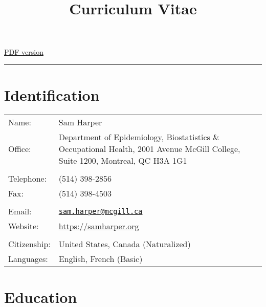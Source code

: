 \documentclass[
  letterpaper,
  DIV=11,
  numbers=noendperiod]{scrartcl}
\title{Curriculum Vitae}
\author{}
\date{}
\begin{document}
\maketitle
\ifdefined\Shaded\renewenvironment{Shaded}{\begin{tcolorbox}[boxrule=0pt, breakable, interior hidden, sharp corners, frame hidden, borderline west={3pt}{0pt}{shadecolor}, enhanced]}{\end{tcolorbox}}\fi

\href{/cv/index.pdf}{PDF version}

\begin{center}\rule{0.5\linewidth}{0.5pt}\end{center}

\hypertarget{identification}{%
\section{Identification}\label{identification}}

\begin{longtable}[]{@{}
  >{\raggedright\arraybackslash}p{}
  >{\raggedright\arraybackslash}p{}@{}}
\toprule\noalign{}
\endhead
\bottomrule\noalign{}
\endlastfoot
Name: & Sam Harper \\
Office: & Department of Epidemiology, Biostatistics \& Occupational
Health, 2001 Avenue McGill College, Suite 1200, Montreal, QC H3A 1G1 \\
& \\
Telephone: & (514) 398-2856 \\
Fax: & (514) 398-4503 \\
& \\
Email: &
\href{mailto:sam.harper@mcgill.ca}{\nolinkurl{sam.harper@mcgill.ca}} \\
Website: & \url{https://samharper.org} \\
& \\
Citizenship: & United States, Canada (Naturalized) \\
Languages: & English, French (Basic) \\
\end{longtable}

\hypertarget{education}{%
\section{Education}\label{education}}
\end{document}
